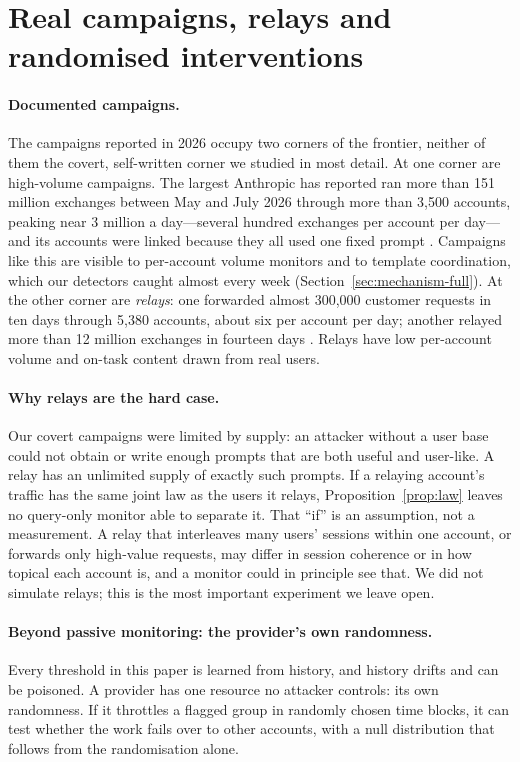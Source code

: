 \section{Real campaigns, relays and randomised interventions}
\label{sec:world-full}

\paragraph{Documented campaigns.} The campaigns reported in 2026 occupy two corners of the frontier, neither of them the covert, self-written corner we studied in most detail. At one corner are high-volume campaigns. The largest Anthropic has reported ran more than 151 million exchanges between May and July 2026 through more than 3{,}500 accounts, peaking near 3 million a day---several hundred exchanges per account per day---and its accounts were linked because they all used one fixed prompt \citep{anthropic2026threat}. Campaigns like this are visible to per-account volume monitors and to template coordination, which our detectors caught almost every week (Section~\ref{sec:mechanism-full}). At the other corner are \emph{relays}: one forwarded almost 300{,}000 customer requests in ten days through 5{,}380 accounts, about six per account per day; another relayed more than 12 million exchanges in fourteen days \citep{anthropic2026threat}. Relays have low per-account volume and on-task content drawn from real users.

\paragraph{Why relays are the hard case.} Our covert campaigns were limited by supply: an attacker without a user base could not obtain or write enough prompts that are both useful and user-like. A relay has an unlimited supply of exactly such prompts. If a relaying account's traffic has the same joint law as the users it relays, Proposition~\ref{prop:law} leaves no query-only monitor able to separate it. That ``if'' is an assumption, not a measurement. A relay that interleaves many users' sessions within one account, or forwards only high-value requests, may differ in session coherence or in how topical each account is, and a monitor could in principle see that. We did not simulate relays; this is the most important experiment we leave open.

\paragraph{Beyond passive monitoring: the provider's own randomness.} Every threshold in this paper is learned from history, and history drifts and can be poisoned. A provider has one resource no attacker controls: its own randomness. If it throttles a flagged group in randomly chosen time blocks, it can test whether the work fails over to other accounts, with a null distribution that follows from the randomisation alone.

